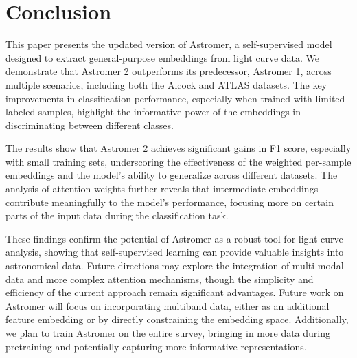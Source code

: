 \section{Conclusion}\label{sec:conclusion}
This paper presents the updated version of Astromer, a self-supervised model designed to extract general-purpose embeddings from light curve data. We demonstrate that Astromer 2 outperforms its predecessor, Astromer 1, across multiple scenarios, including both the Alcock and ATLAS datasets. The key improvements in classification performance, especially when trained with limited labeled samples, highlight the informative power of the embeddings in discriminating between different classes.

The results show that Astromer 2 achieves significant gains in F1 score, especially with small training sets, underscoring the effectiveness of the weighted per-sample embeddings and the model’s ability to generalize across different datasets. The analysis of attention weights further reveals that intermediate embeddings contribute meaningfully to the model's performance, focusing more on certain parts of the input data during the classification task.

These findings confirm the potential of Astromer as a robust tool for light curve analysis, showing that self-supervised learning can provide valuable insights into astronomical data. Future directions may explore the integration of multi-modal data and more complex attention mechanisms, though the simplicity and efficiency of the current approach remain significant advantages. Future work on Astromer will focus on incorporating multiband data, either as an additional feature embedding or by directly constraining the embedding space. Additionally, we plan to train Astromer on the entire survey, bringing in more data during pretraining and potentially capturing more informative representations. 